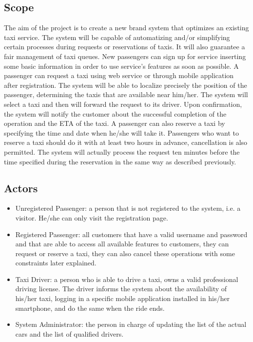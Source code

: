 \documentclass[a4paper,12pt]{article}%
\begin{document}
\subsection{Scope}
The aim of the project is to create a new brand system that optimizes an 
existing taxi service.
The system will be capable of automatizing  and/or simplifying certain 
processes during requests or reservations of taxis.
It will also guarantee a fair management of taxi queues.
New passengers can sign up for service inserting some basic information in order to use service's features as soon as possible.
A passenger can request a taxi using web service or through mobile
application after registration. The system will be able to localize precisely the position
of the passenger, determining the taxis that are available near
him/her. The system will select a taxi and then will forward the request to its driver.
Upon confirmation, the system will notify the customer about the successful completion of the operation and the ETA of the taxi. A passenger can also reserve a taxi by specifying the time and date when he/she will take it.
Passengers who want to reserve a taxi should do it with at least two hours in advance, cancellation is also permitted. The system will actually process the request ten minutes before the time specified during the reservation in the same way as described previously.

\subsection{Actors}
\begin{itemize}
\item Unregistered Passenger: a person that is not registered to the system, i.e. a visitor. He/she can only visit the registration page.
\item Registered Passenger: all customers that have a valid username and password and that are able to access all available features to customers, they can request or reserve a taxi, they can also cancel these operations with some constraints later explained.
\item Taxi Driver: a person who is able to drive a taxi, owns a valid 
professional driving license. The driver informs the system about the availability of his/her taxi, logging in a specific mobile application installed in his/her smartphone, and do the same when the ride ends. 
\item System Administrator: the person in charge of updating the list of the actual cars and the list of qualified drivers.
\end{itemize}
\end{document}
